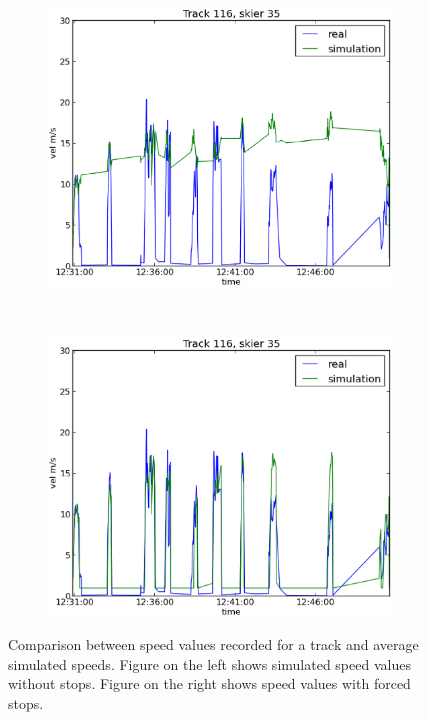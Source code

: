 \documentclass[12pt,a4paper,twoside]{book}
\begin{document}
\begin{figure}[!h]
        \centering
        \begin{subfigure}[b]{0.5\textwidth}
                \centering
                \includegraphics[width=\textwidth]{images/sm_track116.eps}
        \end{subfigure}%
        ~ %
        \begin{subfigure}[b]{0.5\textwidth}
                \centering
                \includegraphics[width=\textwidth]{images/sm_stops_track116.eps}
        \end{subfigure}
        \caption{Comparison between speed values recorded for a track and average simulated speeds. Figure on the left shows simulated speed values without stops. Figure on the right shows speed values with forced stops.}\label{speeds}
\end{figure}
\end{document}
